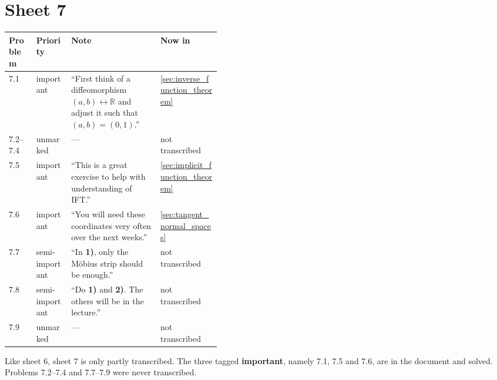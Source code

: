 \section{Sheet 7}
\label{sec:sheet_index_7}

\begin{center}
\begin{tabular}{@{}l l p{0.42\linewidth} l@{}}
\textbf{Problem} & \textbf{Priority} & \textbf{Note} & \textbf{Now in} \\
\hline
7.1 & important & ``First think of a diffeomorphism $(a,b) \leftrightarrow \mathbb{R}$ and
  adjust it such that $(a,b)=(0,1)$.'' & \cref{sec:inverse_function_theorem} \\[3pt]
7.2--7.4 & unmarked & --- & not transcribed \\[3pt]
7.5 & important & ``This is a great exercise to help with understanding of IFT.'' &
  \cref{sec:implicit_function_theorem} \\[3pt]
7.6 & important & ``You will need these coordinates very often over the next weeks.'' &
  \cref{sec:tangent_normal_spaces} \\[3pt]
7.7 & semi-important & ``In \textbf{1)}, only the M\"obius strip should be enough.'' &
  not transcribed \\[3pt]
7.8 & semi-important & ``Do \textbf{1)} and \textbf{2)}. The others will be in the lecture.'' &
  not transcribed \\[3pt]
7.9 & unmarked & --- & not transcribed \\
\end{tabular}
\end{center}


\begin{ainote}
Like sheet 6, sheet 7 is only partly transcribed. The three tagged \textbf{important},
namely 7.1, 7.5 and 7.6, are in the document and solved. Problems 7.2--7.4 and 7.7--7.9 were
never transcribed.
\end{ainote}

